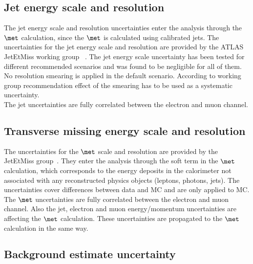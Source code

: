 \subsection{Jet energy scale and resolution}
The jet energy scale and resolution uncertainties enter the analysis through 
the $\met$ calculation, since the $\met$ is calculated using calibrated jets. 
The uncertainties for the jet energy scale and resolution are provided 
by the ATLAS JetEtMiss working group ~\cite{jet_calib_syst_13TeV, JESUncer13TeV}. 
The jet energy scale uncertainty has been tested for different recommended scenarios 
and was found to be negligible for all of them.\\
No resolution smearing is applied in the default scenario. 
According to working group recommendation effect of the smearing has to be used as a systematic uncertainty.\\ The jet uncertainties are fully correlated between the electron and muon channel.

\subsection{Transverse missing energy scale and resolution}
The uncertainties for the $\met$ scale and resolution are provided by the JetEtMiss group~\cite{met2015_1}. They enter
the analysis through the soft term in the $\met$ calculation, 
which corresponds to the energy deposits in the calorimeter not associated with
any reconstructed physics objects (leptons, photons, jets).
The uncertainties cover differences between data and MC and are only applied to MC. 
The $\met$ uncertainties are fully correlated between the electron and muon channel. 
Also the jet, electron and muon energy/momentum uncertainties are affecting the $\met$
calculation. These uncertainties are propagated to the $\met$ calculation in the same way.

\subsection{Background estimate uncertainty}

